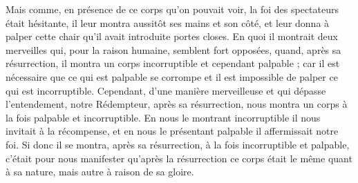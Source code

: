  Mais comme, en présence de ce corps qu’on pouvait voir, la foi des spectateurs était hésitante, il leur montra aussitôt ses mains et son côté, et leur donna à palper cette chair qu’il avait introduite portes closes. En quoi il montrait deux merveilles qui, pour la raison humaine, semblent fort opposées, quand, après sa résurrection, il montra un corps incorruptible et cependant palpable ; car il est nécessaire que ce qui est palpable se corrompe et il est impossible de palper ce qui est incorruptible. Cependant, d’une manière merveilleuse et qui dépasse l’entendement, notre Rédempteur, après sa résurrection, nous montra un corps à la fois palpable et incorruptible. En nous le montrant incorruptible il nous invitait à la récompense, et en nous le présentant palpable il affermissait notre foi. Si donc il se montra, après sa résurrection, à la fois incorruptible et palpable, c’était pour nous manifester qu’après la résurrection ce corps était le même quant à sa nature, mais autre à raison de sa gloire.